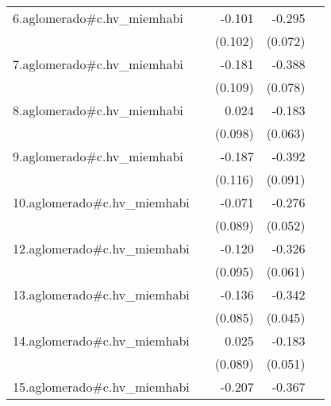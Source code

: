 {\begin{longtable}{l*{4}{D{.}{.}{-1}}}
\addlinespace
6.aglomerado#c.hv\_miemhabi&                     &      -0.101         &      -0.295\sym{***}&                     \\
            &                     &     (0.102)         &     (0.072)         &                     \\
\addlinespace
7.aglomerado#c.hv\_miemhabi&                     &      -0.181         &      -0.388\sym{***}&                     \\
            &                     &     (0.109)         &     (0.078)         &                     \\
\addlinespace
8.aglomerado#c.hv\_miemhabi&                     &       0.024         &      -0.183\sym{**} &                     \\
            &                     &     (0.098)         &     (0.063)         &                     \\
\addlinespace
9.aglomerado#c.hv\_miemhabi&                     &      -0.187         &      -0.392\sym{***}&                     \\
            &                     &     (0.116)         &     (0.091)         &                     \\
\addlinespace
10.aglomerado#c.hv\_miemhabi&                     &      -0.071         &      -0.276\sym{***}&                     \\
            &                     &     (0.089)         &     (0.052)         &                     \\
\addlinespace
12.aglomerado#c.hv\_miemhabi&                     &      -0.120         &      -0.326\sym{***}&                     \\
            &                     &     (0.095)         &     (0.061)         &                     \\
\addlinespace
13.aglomerado#c.hv\_miemhabi&                     &      -0.136         &      -0.342\sym{***}&                     \\
            &                     &     (0.085)         &     (0.045)         &                     \\
\addlinespace
14.aglomerado#c.hv\_miemhabi&                     &       0.025         &      -0.183\sym{***}&                     \\
            &                     &     (0.089)         &     (0.051)         &                     \\
\addlinespace
15.aglomerado#c.hv\_miemhabi&                     &      -0.207         &      -0.367\sym{***}&                     \\

\end{longtable}}
